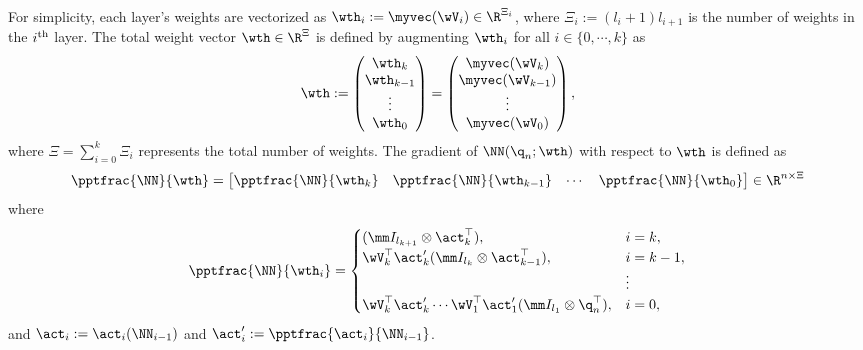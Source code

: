 \documentclass[lettersize,journal]{IEEEtran}
\begin{document}
For simplicity, each layer's weights are vectorized as $\wth_i:=\myvec(\wV_i)\in\R^{\Xi_i}$, where $\Xi_i:= (l_i+1)l_{i+1}$ is the number of weights in the $i\textsuperscript{th}$ layer. 
The total weight vector $\wth\in\R^{\Xi}$ is defined by augmenting $\wth_i$ for all $i\in \{0,\cdots,k\}$ as 
\begin{equation}
    \wth := 
    \begin{pmatrix}
        \wth_k\\
        \wth_{k-1}\\
        \vdots\\
        \wth_0
    \end{pmatrix}
    =
    \begin{pmatrix}
        \myvec(\wV_k)\\
        \myvec(\wV_{k-1})\\
        \vdots\\
        \myvec(\wV_0)
    \end{pmatrix},
\end{equation}
where $\Xi={\sum_{i=0}^{k} \Xi_i}$ represents the total number of weights. The gradient of $ \NN({\q}_n;\wth)$ with respect to $\wth$ is defined as
\begin{equation}
    \pptfrac{\NN}{\wth}=
    \begin{bmatrix}
        \pptfrac{\NN}{\wth_k}&
        \pptfrac{\NN}{\wth_{k-1}}&
    \cdots &
        \pptfrac{\NN}{\wth_0}
    \end{bmatrix}
    \in\R^{n \times \Xi}
    \label{eq. nabla phi}
\end{equation}
where
\begin{equation}
    \pptfrac{\NN}{\wth_i} = 
    \begin{cases}
        (
            \mm I_{l_{k+1}}
            \otimes 
            \act_{k}^\top  
        )
        , 
        &
        i=k
        ,
        \\
        \wV_k^\top\act_{k}' 
        (
            \mm I_{l_{k}}
            \otimes  
            \act_{k-1}^\top  
        )
        , 
        & 
        i=k-1
        ,
        \\
        &
        \vdots 
        \\
        \wV_k^\top\act'_{k} 
        \cdots 
        \wV_1^\top\act_1' 
        (
            \mm I_{l_1}
            \otimes 
            {\q}_n^\top  
        )
        , 
        &
        i = 0
        ,
    \end{cases}
    \label{eq:NN:grad}
\end{equation}
and $\act_i:= \act_i(\NN_{i-1})$ and $\act_i':= \pptfrac{\act_i}{\NN_{i-1}}$.
\end{document}
